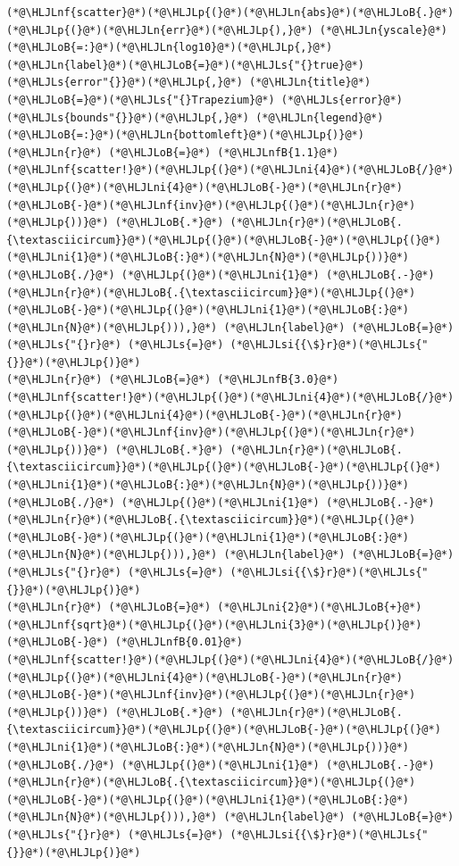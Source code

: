 \documentclass[12pt,a4paper]{article}
\newcommand{\HLJLn}[1]{#1}
\newcommand{\HLJLnf}[1]{\textcolor[RGB]{66,102,213}{#1}}
\newcommand{\HLJLs}[1]{\textcolor[RGB]{201,61,57}{#1}}
\newcommand{\HLJLsi}[1]{#1}
\newcommand{\HLJLnfB}[1]{\textcolor[RGB]{59,151,46}{#1}}
\newcommand{\HLJLni}[1]{\textcolor[RGB]{59,151,46}{#1}}
\newcommand{\HLJLoB}[1]{\textcolor[RGB]{102,102,102}{\textbf{#1}}}
\newcommand{\HLJLp}[1]{#1}
\begin{document}
\begin{lstlisting}
(*@\HLJLnf{scatter}@*)(*@\HLJLp{(}@*)(*@\HLJLn{abs}@*)(*@\HLJLoB{.}@*)(*@\HLJLp{(}@*)(*@\HLJLn{err}@*)(*@\HLJLp{),}@*) (*@\HLJLn{yscale}@*)(*@\HLJLoB{=:}@*)(*@\HLJLn{log10}@*)(*@\HLJLp{,}@*) (*@\HLJLn{label}@*)(*@\HLJLoB{=}@*)(*@\HLJLs{"{}true}@*) (*@\HLJLs{error"{}}@*)(*@\HLJLp{,}@*) (*@\HLJLn{title}@*)(*@\HLJLoB{=}@*)(*@\HLJLs{"{}Trapezium}@*) (*@\HLJLs{error}@*) (*@\HLJLs{bounds"{}}@*)(*@\HLJLp{,}@*) (*@\HLJLn{legend}@*)(*@\HLJLoB{=:}@*)(*@\HLJLn{bottomleft}@*)(*@\HLJLp{)}@*)
(*@\HLJLn{r}@*) (*@\HLJLoB{=}@*) (*@\HLJLnfB{1.1}@*)
(*@\HLJLnf{scatter!}@*)(*@\HLJLp{(}@*)(*@\HLJLni{4}@*)(*@\HLJLoB{/}@*)(*@\HLJLp{(}@*)(*@\HLJLni{4}@*)(*@\HLJLoB{-}@*)(*@\HLJLn{r}@*)(*@\HLJLoB{-}@*)(*@\HLJLnf{inv}@*)(*@\HLJLp{(}@*)(*@\HLJLn{r}@*)(*@\HLJLp{))}@*) (*@\HLJLoB{.*}@*) (*@\HLJLn{r}@*)(*@\HLJLoB{.{\textasciicircum}}@*)(*@\HLJLp{(}@*)(*@\HLJLoB{-}@*)(*@\HLJLp{(}@*)(*@\HLJLni{1}@*)(*@\HLJLoB{:}@*)(*@\HLJLn{N}@*)(*@\HLJLp{))}@*) (*@\HLJLoB{./}@*) (*@\HLJLp{(}@*)(*@\HLJLni{1}@*) (*@\HLJLoB{.-}@*) (*@\HLJLn{r}@*)(*@\HLJLoB{.{\textasciicircum}}@*)(*@\HLJLp{(}@*)(*@\HLJLoB{-}@*)(*@\HLJLp{(}@*)(*@\HLJLni{1}@*)(*@\HLJLoB{:}@*)(*@\HLJLn{N}@*)(*@\HLJLp{))),}@*) (*@\HLJLn{label}@*) (*@\HLJLoB{=}@*) (*@\HLJLs{"{}r}@*) (*@\HLJLs{=}@*) (*@\HLJLsi{{\$}r}@*)(*@\HLJLs{"{}}@*)(*@\HLJLp{)}@*)
(*@\HLJLn{r}@*) (*@\HLJLoB{=}@*) (*@\HLJLnfB{3.0}@*)
(*@\HLJLnf{scatter!}@*)(*@\HLJLp{(}@*)(*@\HLJLni{4}@*)(*@\HLJLoB{/}@*)(*@\HLJLp{(}@*)(*@\HLJLni{4}@*)(*@\HLJLoB{-}@*)(*@\HLJLn{r}@*)(*@\HLJLoB{-}@*)(*@\HLJLnf{inv}@*)(*@\HLJLp{(}@*)(*@\HLJLn{r}@*)(*@\HLJLp{))}@*) (*@\HLJLoB{.*}@*) (*@\HLJLn{r}@*)(*@\HLJLoB{.{\textasciicircum}}@*)(*@\HLJLp{(}@*)(*@\HLJLoB{-}@*)(*@\HLJLp{(}@*)(*@\HLJLni{1}@*)(*@\HLJLoB{:}@*)(*@\HLJLn{N}@*)(*@\HLJLp{))}@*) (*@\HLJLoB{./}@*) (*@\HLJLp{(}@*)(*@\HLJLni{1}@*) (*@\HLJLoB{.-}@*) (*@\HLJLn{r}@*)(*@\HLJLoB{.{\textasciicircum}}@*)(*@\HLJLp{(}@*)(*@\HLJLoB{-}@*)(*@\HLJLp{(}@*)(*@\HLJLni{1}@*)(*@\HLJLoB{:}@*)(*@\HLJLn{N}@*)(*@\HLJLp{))),}@*) (*@\HLJLn{label}@*) (*@\HLJLoB{=}@*) (*@\HLJLs{"{}r}@*) (*@\HLJLs{=}@*) (*@\HLJLsi{{\$}r}@*)(*@\HLJLs{"{}}@*)(*@\HLJLp{)}@*)
(*@\HLJLn{r}@*) (*@\HLJLoB{=}@*) (*@\HLJLni{2}@*)(*@\HLJLoB{+}@*)(*@\HLJLnf{sqrt}@*)(*@\HLJLp{(}@*)(*@\HLJLni{3}@*)(*@\HLJLp{)}@*)  (*@\HLJLoB{-}@*) (*@\HLJLnfB{0.01}@*)
(*@\HLJLnf{scatter!}@*)(*@\HLJLp{(}@*)(*@\HLJLni{4}@*)(*@\HLJLoB{/}@*)(*@\HLJLp{(}@*)(*@\HLJLni{4}@*)(*@\HLJLoB{-}@*)(*@\HLJLn{r}@*)(*@\HLJLoB{-}@*)(*@\HLJLnf{inv}@*)(*@\HLJLp{(}@*)(*@\HLJLn{r}@*)(*@\HLJLp{))}@*) (*@\HLJLoB{.*}@*) (*@\HLJLn{r}@*)(*@\HLJLoB{.{\textasciicircum}}@*)(*@\HLJLp{(}@*)(*@\HLJLoB{-}@*)(*@\HLJLp{(}@*)(*@\HLJLni{1}@*)(*@\HLJLoB{:}@*)(*@\HLJLn{N}@*)(*@\HLJLp{))}@*) (*@\HLJLoB{./}@*) (*@\HLJLp{(}@*)(*@\HLJLni{1}@*) (*@\HLJLoB{.-}@*) (*@\HLJLn{r}@*)(*@\HLJLoB{.{\textasciicircum}}@*)(*@\HLJLp{(}@*)(*@\HLJLoB{-}@*)(*@\HLJLp{(}@*)(*@\HLJLni{1}@*)(*@\HLJLoB{:}@*)(*@\HLJLn{N}@*)(*@\HLJLp{))),}@*) (*@\HLJLn{label}@*) (*@\HLJLoB{=}@*) (*@\HLJLs{"{}r}@*) (*@\HLJLs{=}@*) (*@\HLJLsi{{\$}r}@*)(*@\HLJLs{"{}}@*)(*@\HLJLp{)}@*)
\end{lstlisting}
\end{document}
